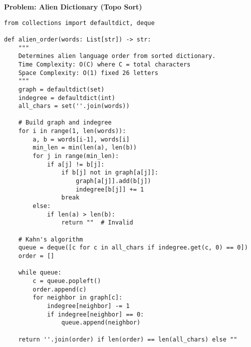 \noindent\textbf{Problem: Alien Dictionary (Topo Sort)}
\begin{verbatim}
from collections import defaultdict, deque

def alien_order(words: List[str]) -> str:
    """
    Determines alien language order from sorted dictionary.
    Time Complexity: O(C) where C = total characters
    Space Complexity: O(1) fixed 26 letters
    """
    graph = defaultdict(set)
    indegree = defaultdict(int)
    all_chars = set(''.join(words))
    
    # Build graph and indegree
    for i in range(1, len(words)):
        a, b = words[i-1], words[i]
        min_len = min(len(a), len(b))
        for j in range(min_len):
            if a[j] != b[j]:
                if b[j] not in graph[a[j]]:
                    graph[a[j]].add(b[j])
                    indegree[b[j]] += 1
                break
        else:
            if len(a) > len(b):
                return ""  # Invalid
    
    # Kahn's algorithm
    queue = deque([c for c in all_chars if indegree.get(c, 0) == 0])
    order = []
    
    while queue:
        c = queue.popleft()
        order.append(c)
        for neighbor in graph[c]:
            indegree[neighbor] -= 1
            if indegree[neighbor] == 0:
                queue.append(neighbor)
    
    return ''.join(order) if len(order) == len(all_chars) else ""
\end{verbatim}

